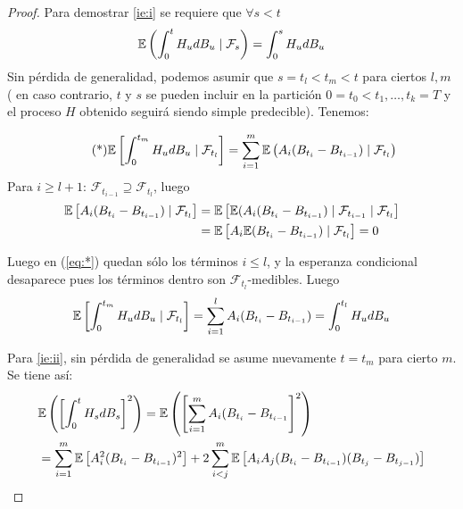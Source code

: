 \begin{proof}
\gris
Para demostrar \ref{ie:i} se requiere que $\forall s < t$
\begin{equation*}
        \mathbb{E} \left( \int_{0}^{t} H_u dB_u  \mid  \mathcal{F}_s \right)  = \int_{0}^{s} H_u dB_u
\end{equation*}
Sin pérdida de generalidad, podemos asumir que $s = t_{l} < t_m < t$ para ciertos $l,m$ (
en caso contrario, $t$ y $s$ se pueden incluir en la partición $0 = t_0 < t_1, \ldots, t_k = T$
y el proceso $H$ obtenido seguirá siendo simple predecible). Tenemos:

\begin{equation*}
        \label{eq:*}
        \tag{*}
        \mathbb{E} \left[ \int_{0}^{t_m} H_u dB_u \mid \mathcal{F}_{t_l} \right] 
        = \sum_{i=1}^{m} \mathbb{E} \left( A_i (B_{t_i} - B_{t_{i-1}}) \mid  \mathcal{F}_{t_l} \right) 
\end{equation*}
Para $i \ge  l+1$: $\mathcal{F}_{t_{i-1}} \supseteq \mathcal{F}_{t_l}$, luego 
\begin{align*}
        \mathbb{E} \left[ A_i (B_{t_i} - B_{t_{i-1}}) \mid \mathcal{F}_{t_l} \right]  
        &= \mathbb{E} \left[ \mathbb{E} (A_{i}(B_{t_i} - B_{t_{i-1}})  \mid
        \mathcal{F}_{t_{i-1}}  \mid  \mathcal{F}_{t_l}  \right]  \\ 
        &= \mathbb{E} \left[ A_{i} \mathbb{E}( B_{t_i} - B_{t_{i-1}})
        \mid \mathcal{F}_{t_l}\right] = 0
\end{align*}

Luego en (\ref{eq:*}) quedan sólo los términos $i \le l$, y la esperanza condicional desaparece pues
los términos dentro son $\mathcal{F}_{t_l}$-medibles. Luego
\begin{equation*}
        \mathbb{E} \left[ \int_{0}^{t_m} H_u dB_u  \mid \mathcal{F}_{t_l} \right]
        = \sum_{i=1}^{l} A_i (B_{t_i} -B_{t_{i-1}}) = \int_{0}^{t_l} H_u dB_u 
\end{equation*}

Para \ref{ie:ii}, sin pérdida de generalidad se asume nuevamente $t=t_m$ para cierto $m$. Se tiene 
así:
\begin{align*}
        &\mathbb{E} \left( \left[\int_{0}^{t} H_s dB_s \right]^2 \right)  
        = \mathbb{E} \left( \left[ \sum_{i=1}^{m} A_i(B_{t_i} -B_{t_{i-1}}\right]^2 \right) \\ 
        &= \sum_{i=1}^{m}\mathbb{E}\left[ A^2_i(B_{t_i} - B_{t_{i-1}})^2
        \right] + 2 \sum_{i<j}^{m} \mathbb{E} \left[ A_i A_j (B_{t_i}
        -B_{t_{i-1}})(B_{t_j} - B_{t_{j-1}} )  \right] 
\end{align*}


\end{proof}
